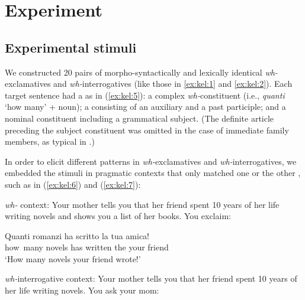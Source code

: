 \documentclass[output=paper]{langsci/langscibook}
\begin{document}
\section{Experiment}
\label{sec:kel:4}

\subsection{Experimental stimuli} 
\label{sec:kel:4.1}

We constructed 20 pairs of morpho-syntactically and lexically identical \textit{wh-}ex\-cla\-ma\-tives and \textit{wh-}in\-ter\-ro\-ga\-tives (like those in \ref{ex:kel:1} and \ref{ex:kel:2}). Each target sentence had a  as in (\ref{ex:kel:5}): a complex \textit{wh-}constituent (i.e., \textit{quanti} ‘how many’ + noun); a  consisting of an auxiliary and a past participle; and a nominal constituent including a grammatical subject. (The definite article preceding the subject constituent was omitted in the case of immediate family members, as typical in .)


In order to elicit different  patterns in \textit{wh-}exclamatives and \textit{wh-}interrogatives, we embedded the stimuli in pragmatic contexts that only matched one or the other , such as in (\ref{ex:kel:6}) and (\ref{ex:kel:7}):


\ea\label{ex:kel:6}
\textit{wh-} context: Your mother tells you that her friend spent 10 years of her life writing novels and shows you a list of her books. You exclaim:

\gll Quanti  romanzi   ha  scritto   la   tua    amica! \\
     how~many   novels has written   the  your friend\\
\glt ‘How many novels your friend wrote!’
\z


\ea\label{ex:kel:7}
\textit{wh-}interrogative context: Your mother tells you that her friend spent 10 years of her life writing novels. You ask your mom:
\end{document}
